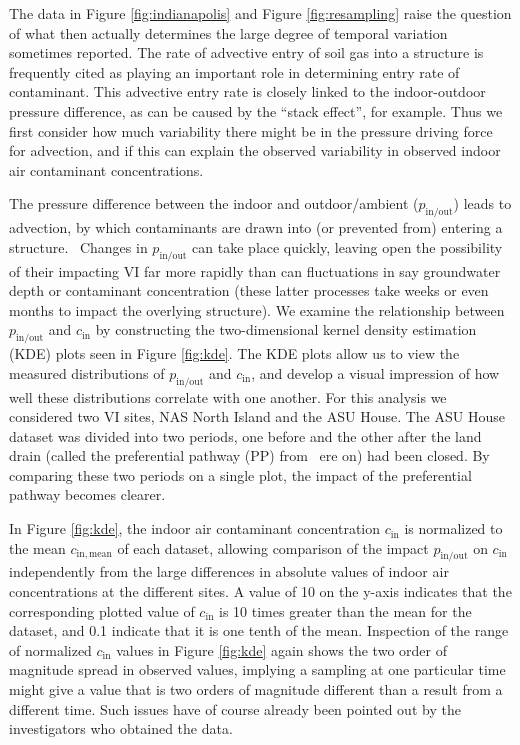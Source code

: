 \documentclass[journal=esthag,manuscript=article]{achemso}
\begin{document}
The data in Figure \ref{fig:indianapolis} and Figure \ref{fig:resampling} raise the question of what then actually determines the large degree of temporal variation sometimes reported.
The rate of advective entry of soil gas into a structure is frequently cited as playing an important role in determining entry rate of contaminant.
This advective entry rate is closely linked to the indoor-outdoor pressure difference, as can be caused by the “stack effect”, for example.
Thus we first consider how much variability there might be in the pressure driving force for advection, and if this can explain the observed variability in observed indoor air contaminant concentrations.\par

The pressure difference between the indoor and outdoor/ambient ($p_\mathrm{in/out}$) leads to advection, by which contaminants are drawn into (or prevented from) entering a structure.  Changes in $p_\mathrm{in/out}$ can take place quickly, leaving open the possibility of their impacting VI far more rapidly than can fluctuations in say groundwater depth or contaminant concentration (these latter processes take weeks or even months to impact the overlying structure).
We examine the relationship between $p_\mathrm{in/out}$ and $c_\mathrm{in}$ by constructing the two-dimensional kernel density estimation (KDE) plots seen in Figure \ref{fig:kde}.
The KDE plots allow us to view the measured distributions of $p_\mathrm{in/out}$ and $c_\mathrm{in}$, and develop a visual impression of how well these distributions correlate with one another.
For this analysis we considered two VI sites, NAS North Island and the ASU House.
The ASU House dataset was divided into two periods, one before and the other after the land drain (called the preferential pathway (PP) from  ere on) had been closed.
By comparing these two periods on a single plot, the impact of the preferential pathway becomes clearer.\par

In Figure \ref{fig:kde}, the indoor air contaminant concentration $c_\mathrm{in}$ is normalized to the mean $c_\mathrm{in,mean}$ of each dataset, allowing comparison of the impact $p_\mathrm{in/out}$ on $c_\mathrm{in}$ independently from the large differences in absolute values of indoor air concentrations at the different sites.
A value of 10 on the y-axis indicates that the corresponding plotted value of $c_\mathrm{in}$ is 10 times greater than the mean for the dataset, and 0.1 indicate that it is one tenth of the mean.
Inspection of the range of normalized $c_\mathrm{in}$ values in Figure \ref{fig:kde} again shows the two order of magnitude spread in observed values, implying a sampling at one particular time might give a value that is two orders of magnitude different than a result from a different time.
Such issues have of course already been pointed out by the investigators who obtained the data.
\end{document}

